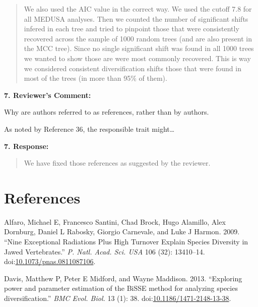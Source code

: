 \documentclass[]{article}
\begin{document}
\begin{quote}
\color{blue}
We also used the AIC value in the correct way. We used the cutoff 7.8
for all MEDUSA analyses. Then we counted the number of significant
shifts infered in each tree and tried to pinpoint those that were
consistently recovered across the sample of 1000 random trees (and are
also present in the MCC tree). Since no single significant shift was
found in all 1000 trees we wanted to show those are were most commonly
recovered. This is way we considered consistent diversification shifts
those that were found in most of the trees (in more than 95\% of them).
\end{quote}

\textbf{7. Reviewer's Comment:}

Why are authors referred to as references, rather than by authors.

As noted by Reference 36, the responsible trait might\ldots{}

\textbf{7. Response:}

\begin{quote}
\color{blue}
We have fixed those references as suggested by the reviewer.
\end{quote}

\section*{References}\label{references}

Alfaro, Michael E, Francesco Santini, Chad Brock, Hugo Alamillo, Alex
Dornburg, Daniel L Rabosky, Giorgio Carnevale, and Luke J Harmon. 2009.
``Nine Exceptional Radiations Plus High Turnover Explain Species
Diversity in Jawed Vertebrates.'' \emph{P. Natl. Acad. Sci. USA} 106
(32): 13410--14.
doi:\href{http://dx.doi.org/10.1073/pnas.0811087106}{10.1073/pnas.0811087106}.

Davis, Matthew P, Peter E Midford, and Wayne Maddison. 2013. ``Exploring
power and parameter estimation of the BiSSE method for analyzing species
diversification.'' \emph{BMC Evol. Biol.} 13 (1): 38.
doi:\href{http://dx.doi.org/10.1186/1471-2148-13-38}{10.1186/1471-2148-13-38}.
\end{document}
